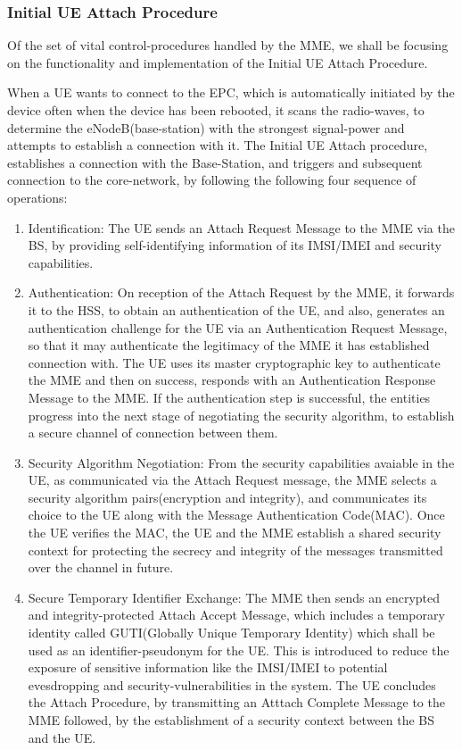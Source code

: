 \documentclass[acmsmall,review,authorversion]{acmart}
\begin{document}
\subsubsection{Initial UE Attach Procedure}
Of the set of vital control-procedures handled by the MME, we shall be focusing on the functionality and implementation of the Initial UE Attach Procedure. 

When a UE wants to connect to the EPC, which is automatically initiated by the device often when the device has been rebooted, it scans the radio-waves, to determine the eNodeB(base-station) with the strongest signal-power and attempts to establish a connection with it. The Initial UE Attach procedure, establishes a connection with the Base-Station, and triggers and subsequent connection to the core-network, by following the following four sequence of operations: 
\begin{enumerate}
\item Identification: The UE sends an Attach Request Message to the MME via the BS, by providing self-identifying information of its IMSI/IMEI and security capabilities. 
\item Authentication: On reception of the Attach Request by the MME, it forwards it to the HSS, to obtain an authentication of the UE, and also, generates an authentication challenge for the UE via an Authentication Request Message, so that it may authenticate the legitimacy of the MME it has established connection with. The UE uses its master cryptographic key to authenticate the MME and then on success, responds with an Authentication Response Message to the MME. If the authentication step is successful, the entities progress into the next stage of negotiating the security algorithm, to establish a secure channel of connection between them. 
\item Security Algorithm Negotiation: From the security capabilities avaiable in the UE, as communicated via the Attach Request message, the MME selects a security algorithm pairs(encryption and integrity), and communicates its choice to the UE along with the Message Authentication Code(MAC). Once the UE verifies the MAC, the UE and the MME establish a shared security context for protecting the secrecy and integrity of the messages transmitted over the channel in future. 
\item Secure Temporary Identifier Exchange: The MME then sends an encrypted and integrity-protected Attach Accept Message, which includes a temporary identity called GUTI(Globally Unique Temporary Identity) which shall be used as an identifier-pseudonym for the UE. This is introduced to reduce the exposure of sensitive information like the IMSI/IMEI to potential evesdropping and security-vulnerabilities in the system. The UE concludes the Attach Procedure, by transmitting an Atttach Complete Message to the MME followed, by the establishment of a  security context between the BS and the UE. 
\end{enumerate}
\end{document}
